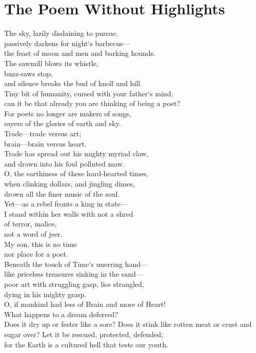 \documentclass[stu]{apa7}
\begin{document}
\newpage
\section{The Poem Without Highlights}

The sky, lazily disdaining to pursue, \\
passively darkens for night`s barbecue— \\
the feast of moon and men and barking hounds. \\
The sawmill blows its whistle, \\
buzz-saws stop, \\
and silence breaks the bud of knoll and hill. \\
\vspace{5mm}
Tiny bit of humanity, cursed with your father`s mind; \\
can it be that already you are thinking of being a poet? \\
For poets no longer are makers of songs, \\
sayers of the glories of earth and sky. \\
\vspace{5mm}
Trade—trade versus art;\\
brain—brain versus heart. \\
Trade has spread out his mighty myriad claw, \\
and drawn into his foul polluted maw. \\
\vspace{5mm}
O, the earthiness of these hard-hearted times, \\
when clinking dollars, and jingling dimes, \\
drown all the finer music of the soul. \\
\vspace{5mm}
Yet—as a rebel fronts a king in state— \\
I stand within her walls with not a shred \\
of terror, malice,  \\
not a word of jeer. \\
My son, this is no time \\
nor place for a poet. \\
\vspace{5mm}
Beneath the touch of Time`s unerring hand— \\
like priceless treasures sinking in the sand— \\
poor art with struggling gasp, lies strangled, \\
dying in his mighty grasp. \\
O, if mankind had less of Brain and more of Heart! \\
\vspace{5mm}
What happens to a dream deferred? \\
Does it dry up
or fester like a sore?
Does it stink like rotten meat
or crust and sugar over?
Let it be rescued, protected, defended; \\
for the Earth is a cultured hell that tests our youth. \\
\vspace{5mm}
\end{document}
